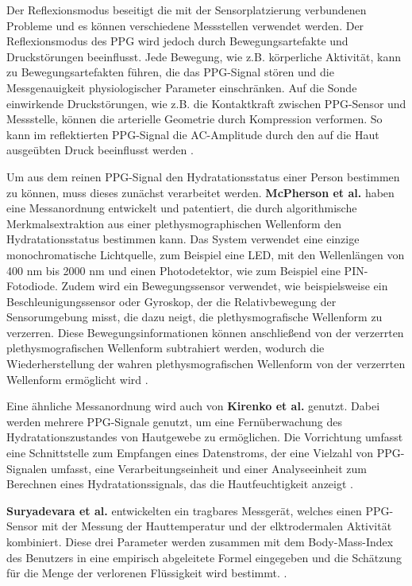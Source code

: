 \documentclass[10pt,a4paper,headinclude,twoside, plainheadsepline, open=right, numbers=noenddot, twocolumn]{article}
\begin{document}
Der Reflexionsmodus beseitigt die mit der Sensorplatzierung verbundenen Probleme und es können verschiedene Messstellen verwendet werden.
Der Reflexionsmodus des PPG wird jedoch durch Bewegungsartefakte und Druckstörungen beeinflusst.
Jede Bewegung, wie z.B. körperliche Aktivität, kann zu Bewegungsartefakten führen, die das PPG-Signal stören und die Messgenauigkeit physiologischer Parameter einschränken.
Auf die Sonde einwirkende Druckstörungen, wie z.B. die Kontaktkraft zwischen PPG-Sensor und Messstelle, können die arterielle Geometrie durch Kompression verformen.
So kann im reflektierten PPG-Signal die AC-Amplitude durch den auf die Haut ausgeübten Druck beeinflusst werden \cite{tamura2014wearable}.

Um aus dem reinen PPG-Signal den Hydratationsstatus einer Person bestimmen zu können, muss dieses zunächst verarbeitet werden.
\textbf{McPherson et al.} haben eine Messanordnung entwickelt und patentiert, die durch algorithmische Merkmalsextraktion aus einer plethysmographischen Wellenform den Hydratationsstatus bestimmen kann. 
Das System verwendet eine einzige monochromatische Lichtquelle, zum Beispiel eine LED, mit den Wellenlängen von 400 nm bis 2000 nm und einen Photodetektor, wie zum Beispiel eine PIN-Fotodiode.
Zudem wird ein Bewegungssensor verwendet, wie beispielsweise ein Beschleunigungssensor oder Gyroskop, der die Relativbewegung der Sensorumgebung misst, die dazu neigt, die plethysmografische Wellenform zu verzerren. 
Diese Bewegungsinformationen können anschließend von der verzerrten plethysmografischen Wellenform subtrahiert werden, wodurch die Wiederherstellung der wahren plethysmografischen Wellenform von der verzerrten Wellenform ermöglicht wird \cite{mcpherson2015systems}.

Eine ähnliche Messanordnung wird auch von \textbf{Kirenko et al.} genutzt.
Dabei werden mehrere PPG-Signale genutzt, um eine Fernüberwachung des Hydratationszustandes von Hautgewebe zu ermöglichen.
Die Vorrichtung umfasst eine Schnittstelle zum Empfangen eines Datenstroms, der eine Vielzahl von PPG-Signalen umfasst, eine Verarbeitungseinheit und
einer Analyseeinheit zum Berechnen eines Hydratationssignals, das die Hautfeuchtigkeit anzeigt \cite{kirenko2017unobtrusive}.

\textbf{Suryadevara et al.} entwickelten ein tragbares Messgerät, welches einen PPG-Sensor mit der Messung der Hauttemperatur und der elktrodermalen Aktivität kombiniert.
Diese drei Parameter werden zusammen mit dem Body-Mass-Index des Benutzers in eine empirisch abgeleitete Formel eingegeben und die Schätzung für die Menge der verlorenen Flüssigkeit wird bestimmt. \cite{suryadevara2015towards}.
\end{document}
